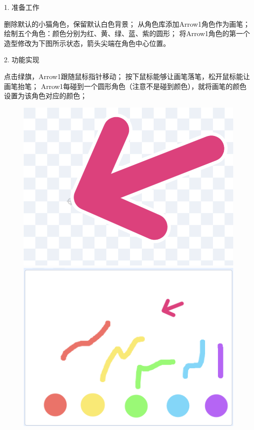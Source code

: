 \documentclass[10pt, a4paper]{article}
\begin{document}
\begin{enumerate}
        1. 准备工作
        \begin{tasks}[label = (\arabic*)]
            \task 删除默认的小猫角色，保留默认白色背景；
            \task 从角色库添加Arrow1角色作为画笔；
            \task 绘制五个角色：颜色分别为红、黄、绿、蓝、紫的圆形；
            \task 将Arrow1角色的第一个造型修改为下图所示状态，箭头尖端在角色中心位置。
        \end{tasks}
        2. 功能实现
        \begin{tasks}[label = (\arabic*)]
            \task 点击绿旗，Arrow1跟随鼠标指针移动；
            \task 按下鼠标能够让画笔落笔，松开鼠标能让画笔抬笔；
            \task Arrow1每碰到一个圆形角色（注意不是碰到颜色），就将画笔的颜色设置为该角色对应的颜色；
        \end{tasks}

        \begin{figure}[htbp]
            \centering
            \begin{minipage}[t]{.29\textwidth}
                \centering
                \includegraphics[width=\textwidth]{figure/37-1.png}
            \end{minipage}
            \begin{minipage}[t]{.29\textwidth}
                \centering
                \includegraphics[width=\textwidth]{figure/37-2.png}

\end{minipage}
\end{figure}
\end{enumerate}
\end{document}
